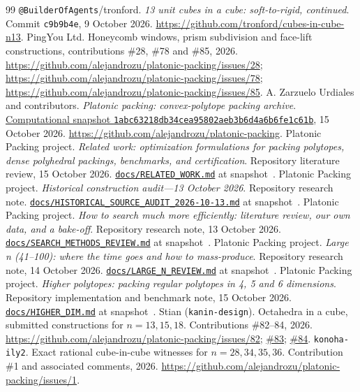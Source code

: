 \documentclass[11pt,a4paper]{article}
\newcommand{\code}[1]{\texttt{\nolinkurl{#1}}}
\newcommand{\frozen}{https://github.com/alejandrozu/platonic-packing/tree/1abc63218db34cea95802aeb3b6d4a6b6fe1c61b}
\newcommand{\blob}{https://github.com/alejandrozu/platonic-packing/blob/1abc63218db34cea95802aeb3b6d4a6b6fe1c61b}
\begin{document}
\begin{thebibliography}{99}
 \code{@BuilderOfAgents}/tronford. \emph{13 unit cubes in a cube: soft-to-rigid, continued}. Commit \code{c9b9b4e}, 9 October 2026. \url{https://github.com/tronford/cubes-in-cube-n13}.
 PingYou Ltd. Honeycomb windows, prism subdivision and face-lift constructions, contributions \#28, \#78 and \#85, 2026. \url{https://github.com/alejandrozu/platonic-packing/issues/28}; \url{https://github.com/alejandrozu/platonic-packing/issues/78}; \url{https://github.com/alejandrozu/platonic-packing/issues/85}.
 A. Zarzuelo Urdiales and contributors. \emph{Platonic packing: convex-polytope packing archive}. \href{\frozen}{Computational snapshot \code{1abc63218db34cea95802aeb3b6d4a6b6fe1c61b}}, 15 October 2026. \url{https://github.com/alejandrozu/platonic-packing}.
 Platonic Packing project. \emph{Related work: optimization formulations for packing polytopes, dense polyhedral packings, benchmarks, and certification}. Repository literature review, 15 October 2026. \href{\blob/docs/RELATED_WORK.md}{\code{docs/RELATED_WORK.md}} at snapshot~\cite{archive}.
 Platonic Packing project. \emph{Historical construction audit---13 October 2026}. Repository research note. \href{\blob/docs/HISTORICAL_SOURCE_AUDIT_2026-10-13.md}{\code{docs/HISTORICAL_SOURCE_AUDIT_2026-10-13.md}} at snapshot~\cite{archive}.
 Platonic Packing project. \emph{How to search much more efficiently: literature review, our own data, and a bake-off}. Repository research note, 13 October 2026. \href{\blob/docs/SEARCH_METHODS_REVIEW.md}{\code{docs/SEARCH_METHODS_REVIEW.md}} at snapshot~\cite{archive}.
 Platonic Packing project. \emph{Large n (41--100): where the time goes and how to mass-produce}. Repository research note, 14 October 2026. \href{\blob/docs/LARGE_N_REVIEW.md}{\code{docs/LARGE_N_REVIEW.md}} at snapshot~\cite{archive}.
 Platonic Packing project. \emph{Higher polytopes: packing regular polytopes in 4, 5 and 6 dimensions}. Repository implementation and benchmark note, 15 October 2026. \href{\blob/docs/HIGHER_DIM.md}{\code{docs/HIGHER_DIM.md}} at snapshot~\cite{archive}.
 Stian (\code{kanin-design}). Octahedra in a cube, submitted constructions for $n=13,15,18$. Contributions \#82--84, 2026. \url{https://github.com/alejandrozu/platonic-packing/issues/82}; \href{https://github.com/alejandrozu/platonic-packing/issues/83}{\#83}; \href{https://github.com/alejandrozu/platonic-packing/issues/84}{\#84}.
 \code{konoha-ily2}. Exact rational cube-in-cube witnesses for $n=28,34,35,36$. Contribution \#1 and associated comments, 2026. \url{https://github.com/alejandrozu/platonic-packing/issues/1}.

\end{thebibliography}
\end{document}
